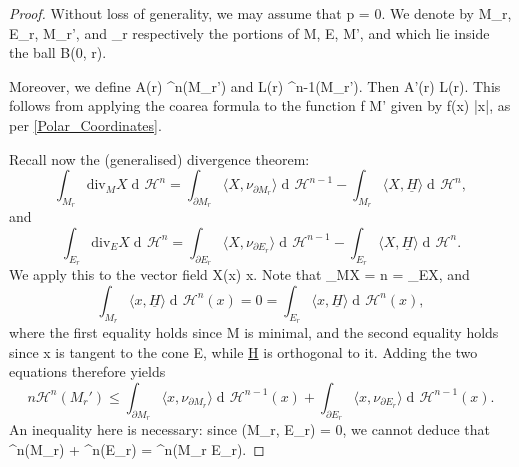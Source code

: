 \documentclass[a4paper, 11pt]{article}
\theoremstyle{plain}
\theoremstyle{definition}
\theoremstyle{remark}
\DeclareMathOperator{\diff}{d \!}
\renewcommand{\div}{\text{div}} %
\numberwithin{equation}{subsection}
\def\({}
\def\){}
\begin{document}
\begin{proof}
Without loss of generality, we may assume that \(p = 0\). We denote by \(M_{r}\), \(E_{r}\), \(M_{r}'\), and \(\Gamma_{r}\) respectively the portions of \(M\), \(E\), \(M'\), and \(\Gamma\) which lie inside the ball \(B(0, r)\).  

Moreover, we define \(A(r) \coloneq {}^{n}(M_{r}')\) and  \(L(r) \coloneq {}^{n-1}(\partial M_{r}')\). Then \(A'(r) \geqslant L(r)\). This follows from applying the coarea formula to the function \(f \vcentcolon M' \rightarrow {}\) given by \(f(x) \coloneq |x|\), as per \cref{Polar_Coordinates}.

Recall now the (generalised) divergence theorem:
\begin{equation}
\int_{M_{r}}\div_{M}X \diff \mathcal{H}^{n} = \int_{\partial M_{r}} \langle X, \nu_{\partial M_{r}} \rangle \diff \mathcal{H}^{n-1} - \int_{M_{r}} \langle X, \underline{H} \rangle \diff \mathcal{H}^{n},
\end{equation}
and
\begin{equation}
\int_{E_{r}}\div_{E}X \diff \mathcal{H}^{n} = \int_{\partial E_{r}} \langle X, \nu_{\partial E_{r}} \rangle \diff \mathcal{H}^{n-1} - \int_{E_{r}} \langle X, \underline{H} \rangle \diff \mathcal{H}^{n}.
\end{equation}
We apply this to the vector field \(X(x) \equiv x\). Note that \(\div_{M}X = n = \div_{E}X\), and
\begin{equation}
\int_{M_{r}}\langle x, \underline{H} \rangle \diff \mathcal{H}^{n}(x) = 0 = \int_{E_{r}}\langle x, \underline{H} \rangle \diff \mathcal{H}^{n}(x),
\end{equation}
where the first equality holds since \(M\) is minimal, and the second equality holds since \(x\) is tangent to the cone \(E\), while \(\underline{H}\) is orthogonal to it. Adding the two equations therefore yields
\begin{equation}
n \mathcal{H}^{n}(M_{r}') \leqslant \int_{\partial M_{r}} \langle x, \nu_{\partial M_{r}} \rangle \diff \mathcal{H}^{n-1}(x) +  \int_{\partial E_{r}} \langle x, \nu_{\partial E_{r}} \rangle \diff \mathcal{H}^{n-1}(x).
\end{equation}
An inequality here is necessary: since \((M_{r}, E_{r}) = 0\), we cannot deduce that \(^{n}(M_{r}) + ^{n}(E_{r}) = ^{n}(M_{r} \cup E_{r})\).


\end{proof}
\end{document}
